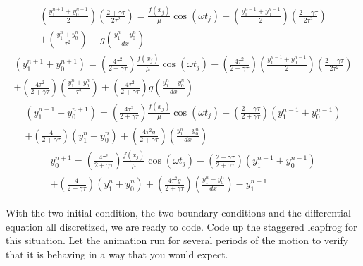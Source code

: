 \begin{enumerate}
\begin{enumerate}
\begin{multline}
\end{multline}
\begin{multline}
  \left(  \frac{y_1^{n + 1} + y_0^{n+1}}{2}\right) \left(\frac{2 + \gamma \tau}{2 \tau^2}\right)   = \frac{f(x_j)}{\mu} \cos
  (\omega t_j) - \left(  \frac{y_1^{n - 1} + y_0^{n - 1}}{2}\right) \left(\frac{2 - \gamma \tau}{2 \tau^2}\right)\\ + \left(\frac{y_1^n + y_0^n}{\tau^2}\right) + g \left( \frac{y_1^n - y_0^n}{ dx}\right)
\end{multline}
\begin{multline}
  \left(  y_1^{n + 1} + y_0^{n+1}\right)   = \left(\frac{4 \tau^2 }{2 + \gamma \tau}\right)\frac{f(x_j)}{\mu} \cos
  (\omega t_j) - \left(\frac{4 \tau^2 }{2 + \gamma \tau}\right)\left(
    \frac{y_1^{n - 1} + y_0^{n - 1}}{2}\right) \left(\frac{2 - \gamma \tau}{2 \tau^2}\right)\\ + \left(\frac{4 \tau^2 }{2 + \gamma \tau}\right)\left(\frac{y_1^n + y_0^n}{\tau^2}\right) + \left(\frac{4 \tau^2 }{2 + \gamma \tau}\right) g \left( \frac{y_1^n - y_0^n}{ dx}\right)
\end{multline}
\begin{multline}
  \left(  y_1^{n + 1} + y_0^{n+1}\right)   = \left(\frac{4 \tau^2 }{2 + \gamma \tau}\right)\frac{f(x_j)}{\mu} \cos
  (\omega t_j) - \left(\frac{2 - \gamma \tau }{2 + \gamma
      \tau}\right)\left(  y_1^{n - 1} + y_0^{n - 1}\right) \\ + \left(\frac{4 }{2 + \gamma \tau}\right)\left(y_1^n + y_0^n\right) + \left(\frac{4 \tau^2g }{2 + \gamma \tau}\right)\left( \frac{y_1^n - y_0^n}{ dx}\right)
\end{multline}
\begin{multline}
  y_0^{n+1}   = \left(\frac{4 \tau^2 }{2 + \gamma \tau}\right)\frac{f(x_j)}{\mu} \cos
  (\omega t_j) - \left(\frac{2 - \gamma \tau }{2 + \gamma
      \tau}\right)\left(  y_1^{n - 1} + y_0^{n - 1}\right) \\ +
  \left(\frac{4 }{2 + \gamma \tau}\right)\left(y_1^n + y_0^n\right) +
  \left(\frac{4 \tau^2g }{2 + \gamma \tau}\right)\left( \frac{y_1^n -
      y_0^n}{ dx}\right) - y_1^{n + 1}
\end{multline}

\fi

\subprob With the two initial condition, the two boundary conditions
and the differential equation all discretized, we are ready to code.
Code up the staggered leapfrog for this situation.  Let the animation
run for several periods of the motion to verify that it is behaving in
a way that you would expect.
\end{enumerate}
\end{enumerate}
